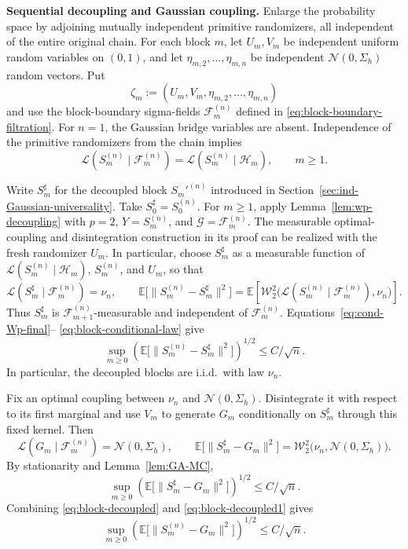\documentclass[11pt,letterpaper]{article}
\theoremstyle{plain}
\theoremstyle{definition}
\theoremstyle{remark}
\newcommand{\E}{\mathbb{E}}
\newcommand{\W}{\mathcal{W}}
\begin{document}
\noindent\textbf{Sequential decoupling and Gaussian coupling.}
Enlarge the probability space by adjoining mutually independent primitive
randomizers, all independent of the entire original chain. For each block
\(m\), let \(U_m,V_m\) be independent uniform random variables on
\((0,1)\), and let
\(\eta_{m,2},\ldots,\eta_{m,n}\) be independent
\(\mathcal N(0,\Sigma_h)\) random vectors. Put
\[
    \zeta_m:=(U_m,V_m,\eta_{m,2},\ldots,\eta_{m,n})
\]
and use the block-boundary sigma-fields
\(\mathcal F_m^{(n)}\) defined in
\eqref{eq:block-boundary-filtration}. For \(n=1\), the Gaussian bridge
variables are absent. Independence of the primitive randomizers from the
chain implies
\begin{equation}
\label{eq:block-conditional-law}
    \mathcal L(S_m^{(n)}\mid\mathcal F_m^{(n)})
    =\mathcal L(S_m^{(n)}\mid\mathcal H_m),
    \qquad m\geq1.
\end{equation}

Write \(S_m^\sharp\) for the decoupled block
\(S_m'^{(n)}\) introduced in Section~\ref{sec:ind-Gaussian-universality}.
Take \(S_0^\sharp=S_0^{(n)}\). For \(m\geq1\), apply
Lemma~\ref{lem:wp-decoupling} with \(p=2\),
\(Y=S_m^{(n)}\), and \(\mathcal G=\mathcal F_m^{(n)}\).
The measurable optimal-coupling and disintegration construction in its proof
can be realized with the fresh randomizer \(U_m\). In particular, choose
\(S_m^\sharp\) as a measurable function of
\(\mathcal L(S_m^{(n)}\mid\mathcal H_m)\), \(S_m^{(n)}\), and \(U_m\),
so that
\[
    \mathcal L(S_m^\sharp\mid\mathcal F_m^{(n)})=\nu_n,
    \qquad
    \E\bigl[\|S_m^{(n)}-S_m^\sharp\|^2\bigr]
    =\E\!\left[
        \W_2^2\bigl(\mathcal L(S_m^{(n)}\mid\mathcal F_m^{(n)}),\nu_n\bigr)
      \right].
\]
Thus \(S_m^\sharp\) is \(\mathcal F_{m+1}^{(n)}\)-measurable and independent
of \(\mathcal F_m^{(n)}\). Equations~\eqref{eq:cond-Wp-final}--
\eqref{eq:block-conditional-law} give
\begin{equation}\label{eq:block-decoupled}
    \sup_{m\geq0}
    \left(\E\bigl[\|S_m^{(n)}-S_m^\sharp\|^2\bigr]\right)^{1/2}
    \leq C/\sqrt n.
\end{equation}
In particular, the decoupled blocks are i.i.d.\ with law \(\nu_n\).

Fix an optimal coupling between \(\nu_n\) and
\(\mathcal N(0,\Sigma_h)\). Disintegrate it with respect to its first
marginal and use \(V_m\) to generate \(G_m\) conditionally on
\(S_m^\sharp\) through this fixed kernel. Then
\[
    \mathcal L(G_m\mid\mathcal F_m^{(n)})=\mathcal N(0,\Sigma_h),
    \qquad
    \E\bigl[\|S_m^\sharp-G_m\|^2\bigr]
    =\W_2^2\bigl(\nu_n,\mathcal N(0,\Sigma_h)\bigr).
\]
By stationarity and Lemma~\ref{lem:GA-MC},
\begin{equation}\label{eq:block-decoupled1}
    \sup_{m\geq0}
    \left(\E\bigl[\|S_m^\sharp-G_m\|^2\bigr]\right)^{1/2}
    \leq C/\sqrt n.
\end{equation}
Combining \eqref{eq:block-decoupled} and \eqref{eq:block-decoupled1} gives
\[
    \sup_{m\geq0}
    \left(\E\bigl[\|S_m^{(n)}-G_m\|^2\bigr]\right)^{1/2}
    \leq C/\sqrt n.
\]
\end{document}
